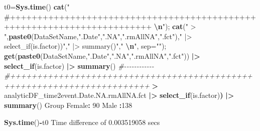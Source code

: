 \documentclass[
]{article}
\newenvironment{Shaded}{\begin{snugshade}}{\end{snugshade}}
\newcommand{\AttributeTok}[1]{\textcolor[rgb]{0.13,0.29,0.53}{#1}}
\newcommand{\CommentTok}[1]{\textcolor[rgb]{0.56,0.35,0.01}{\textit{#1}}}
\newcommand{\DecValTok}[1]{\textcolor[rgb]{0.00,0.00,0.81}{#1}}
\newcommand{\ErrorTok}[1]{\textcolor[rgb]{0.64,0.00,0.00}{\textbf{#1}}}
\newcommand{\FloatTok}[1]{\textcolor[rgb]{0.00,0.00,0.81}{#1}}
\newcommand{\FunctionTok}[1]{\textcolor[rgb]{0.13,0.29,0.53}{\textbf{#1}}}
\newcommand{\NormalTok}[1]{#1}
\newcommand{\OtherTok}[1]{\textcolor[rgb]{0.56,0.35,0.01}{#1}}
\newcommand{\SpecialCharTok}[1]{\textcolor[rgb]{0.81,0.36,0.00}{\textbf{#1}}}
\newcommand{\StringTok}[1]{\textcolor[rgb]{0.31,0.60,0.02}{#1}}
\begin{document}
\begin{Shaded}
\begin{Highlighting}[]

\NormalTok{t0}\OtherTok{=}\FunctionTok{Sys.time}\NormalTok{()}
\FunctionTok{cat}\NormalTok{(}\StringTok{"   \#++++++++++++++++++++++++++++++++++++++++++++++++++++++++++++++++++++++++    }\SpecialCharTok{\textbackslash{}n}\StringTok{"}\NormalTok{); }\FunctionTok{cat}\NormalTok{(}\StringTok{" \textgreater{} "}\NormalTok{,}\FunctionTok{paste0}\NormalTok{(DataSetName,}\StringTok{".Date"}\NormalTok{,}\StringTok{".NA"}\NormalTok{,}\StringTok{".rmAllNA"}\NormalTok{,}\StringTok{".fct"}\NormalTok{),}\StringTok{" |\textgreater{} select\_if(is.factor))"}\NormalTok{,}\StringTok{" |\textgreater{} summary()"}\NormalTok{,}\StringTok{"  }\SpecialCharTok{\textbackslash{}n}\StringTok{"}\NormalTok{, }\AttributeTok{sep=}\StringTok{""}\NormalTok{); }\FunctionTok{get}\NormalTok{(}\FunctionTok{paste0}\NormalTok{(DataSetName,}\StringTok{".Date"}\NormalTok{,}\StringTok{".NA"}\NormalTok{,}\StringTok{".rmAllNA"}\NormalTok{,}\StringTok{".fct"}\NormalTok{)) }\SpecialCharTok{|\textgreater{}} \FunctionTok{select\_if}\NormalTok{(is.factor) }\SpecialCharTok{|\textgreater{}} \FunctionTok{summary}\NormalTok{() }\CommentTok{\#{-}{-}{-}{-}{-}{-}{-}{-}{-}{-}{-}{-}  }
   \CommentTok{\#++++++++++++++++++++++++++++++++++++++++++++++++++++++++++++++++++++++++    }
 \SpecialCharTok{\textgreater{}}\NormalTok{ analyticDF\_time2event.Date.NA.rmAllNA.fct }\SpecialCharTok{|\textgreater{}} \FunctionTok{select\_if}\NormalTok{(is.factor)}\ErrorTok{)} \SpecialCharTok{|\textgreater{}} \FunctionTok{summary}\NormalTok{()  }
\NormalTok{    Group    }
\NormalTok{ Female}\SpecialCharTok{:} \DecValTok{90}  
\NormalTok{ Male  }\SpecialCharTok{:}\DecValTok{138}  
\end{Highlighting}
\end{Shaded}

\begin{Shaded}
\begin{Highlighting}[]
\FunctionTok{Sys.time}\NormalTok{()}\SpecialCharTok{{-}}\NormalTok{t0}
\NormalTok{Time difference of }\FloatTok{0.003519058}\NormalTok{ secs}
\end{Highlighting}
\end{Shaded}
\end{document}
